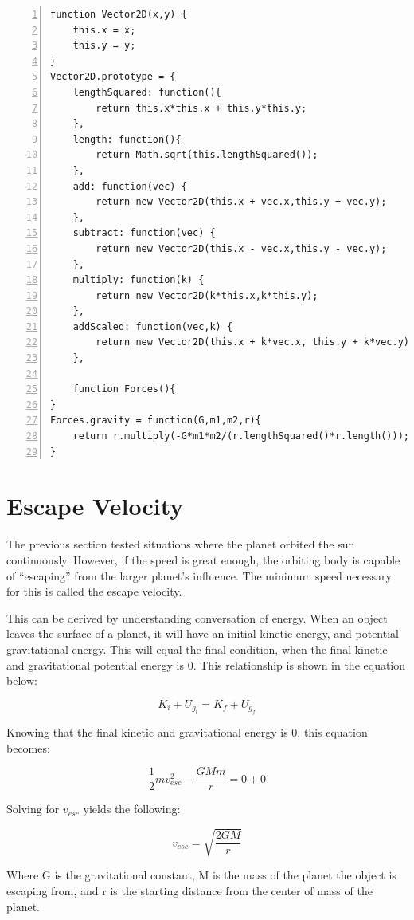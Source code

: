 \begin{lstlisting}[breaklines=true, frame=single, numbers=left, caption=Various tools functions used for orbit simulation, label=lst:basicorbittools]
function Vector2D(x,y) {
	this.x = x;
	this.y = y;		
}	
Vector2D.prototype = {		
	lengthSquared: function(){
		return this.x*this.x + this.y*this.y;
	},
	length: function(){
		return Math.sqrt(this.lengthSquared());
	},
	add: function(vec) {
		return new Vector2D(this.x + vec.x,this.y + vec.y);
	},
	subtract: function(vec) {
		return new Vector2D(this.x - vec.x,this.y - vec.y);
	},
	multiply: function(k) {
		return new Vector2D(k*this.x,k*this.y);
	},
	addScaled: function(vec,k) {
		return new Vector2D(this.x + k*vec.x, this.y + k*vec.y);
	},	

	function Forces(){
}
Forces.gravity = function(G,m1,m2,r){
	return r.multiply(-G*m1*m2/(r.lengthSquared()*r.length()));
}
\end{lstlisting}


\section{Escape Velocity}

The previous section tested situations where the planet orbited the sun continuously.  However, if the speed is great enough, the orbiting body is capable of ``escaping'' from the larger planet's influence.  The minimum speed necessary for this is called the escape velocity.  

This can be derived by understanding conversation of energy.  When an object leaves the surface of a planet, it will have an initial kinetic energy, and potential gravitational energy.  This will equal the final condition, when the final kinetic and gravitational potential energy is 0.  This relationship is shown in the equation below:

$$K_i + U_{g_{i}} = K_f + U_{g_{f}}$$

Knowing that the final kinetic and gravitational energy is 0, this equation becomes:

$$\frac{1}{2}mv_{esc}^2 - \frac{GMm}{r} = 0 + 0  $$

Solving for $v_{esc}$ yields the following:

\begin{equation}\label{eq:escapevelocity}
v_{esc} = \sqrt{\frac{2GM}{r}}
\end{equation}

Where G is the gravitational constant, M is the mass of the planet the object is escaping from, and r is the starting distance from the center of mass of the planet.  

